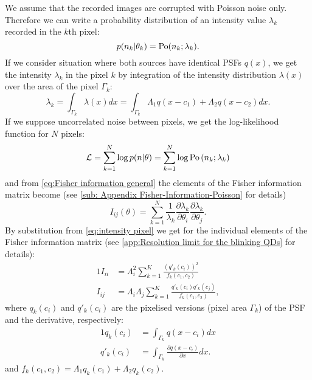 We assume that the recorded images are corrupted with Poisson noise only. Therefore we can write a probability distribution of an intensity value $\lambda_k$ recorded in the $k$th pixel:
%
\begin{equation}
	p(n_k|\theta_k)=\mathrm{Po}(n_k;\lambda_k).
\end{equation}
%
If we consider situation where both sources have identical PSFs $q(x)$, we get the intensity $\lambda_k$ in the pixel $k$ by integration of the intensity distribution $\lambda(x)$ over the area of the pixel $\Gamma_k$:
%
\begin{equation}
	\lambda_k=\int_{\Gamma_k}\lambda(x)dx=\int_{\Gamma_k}\Lambda_1q(x-c_1)+\Lambda_2q(x-c_2)dx.
	\label{eq:intensity pixel}
\end{equation}
%
If we suppose uncorrelated noise between pixels, we get the log-likelihood function for $N$ pixels: 
%
\begin{equation}
	\mathcal{L}=\sum_{k=1}^N\log p(n|\theta)=\sum_{k=1}^N\log\mathrm{Po}\left(n_k;\lambda_k\right)
	\label{eq:FREM likekihood Poisson}
\end{equation}
%
and from \autoref{eq:Fisher information general} the elements of the Fisher information matrix become (see \autoref{sub: Appendix Fisher-Information-Poisson} for details)
%
\begin{equation}
	I_{ij}(\theta)=\sum_{k=1}^N\frac{1}{\lambda_k}\frac{\partial\lambda_k}{\partial\theta_i}\frac{\partial\lambda_k}{\partial\theta_j}.
\end{equation}
%
By substitution from \autoref{eq:intensity pixel} we get for the individual elements of the Fisher information matrix (see \autoref{app:Resolution limit for the blinking QDs} for details): 
%
\begin{alignat}{1}
	I_{ii} & =\Lambda_i^2\sum_{k=1}^{K}\frac{\left(q'_k(c_i)\right)^2}{f_k(c_1,c_2)}\nonumber\\
	I_{ij} & =\Lambda_i\Lambda_j\sum_{k=1}^{K}\frac{q'_k(c_i)q'_k(c_j)}{f_k(c_1,c_2)},
	\label{eq:FI - individual}
\end{alignat}
%
where $q_k(c_i)$ and $q'_k(c_i)$ are the pixelised versions (pixel area $\Gamma_k$) of the PSF and the derivative, respectively:
%
\begin{alignat*}{1}
	q_k(c_i) & =\int_{\Gamma_k}q(x-c_i)dx\\
	q'_k(c_i) & =\int_{\Gamma_k}\frac{\partial q(x-c_i)}{\partial x}dx.
\end{alignat*}
%
and $f_k(c_1,c_2)=\Lambda_1q_k(c_1)+\Lambda_2q_k(c_2)$.

